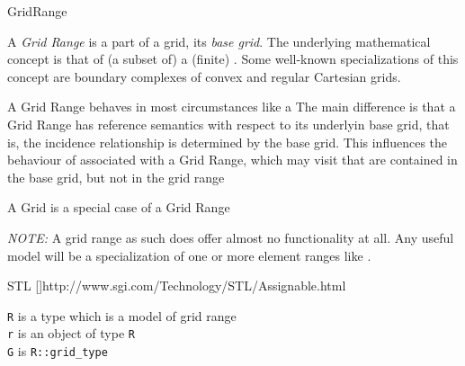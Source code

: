 \begin{Label}{GridRange}  
\end{Label}

    A {\em  Grid Range} is a part of a grid, its {\em  base grid}.
    The underlying mathematical concept
    is that of (a subset of) a (finite) 
    .
    Some well-known specializations of this concept are
    boundary complexes of convex 
    and regular Cartesian grids.

    A Grid Range behaves in most circumstances like a 
    The main difference is that a Grid Range has reference semantics with respect to
    its underlyin base grid, that is, the incidence relationship is determined by the 
    base grid.
    This influences the behaviour of
    associated with a Grid Range,
    which may  visit 
    that are contained in the base grid,
    but not  in the grid range    
    
    A Grid is a special case of a Grid 
    Range  %

    {\em  NOTE:} A grid range as such does offer almost no functionality at all.
    Any useful model will be a specialization of one or more 
    element ranges 
    like     
    .

     STL []{http://www.sgi.com/Technology/STL/Assignable.html}


    {\tt  R} is a type which is a model of grid range
    \\
    {\tt  r} is an object of type {\tt  R}
    \\
    {\tt G} is {\tt R::grid\_type}

